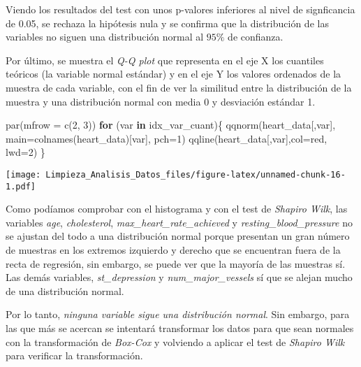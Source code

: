 \documentclass[
]{article}
\newenvironment{Shaded}{\begin{snugshade}}{\end{snugshade}}
\newcommand{\AttributeTok}[1]{\textcolor[rgb]{0.77,0.63,0.00}{#1}}
\newcommand{\CommentTok}[1]{\textcolor[rgb]{0.56,0.35,0.01}{\textit{#1}}}
\newcommand{\ControlFlowTok}[1]{\textcolor[rgb]{0.13,0.29,0.53}{\textbf{#1}}}
\newcommand{\DecValTok}[1]{\textcolor[rgb]{0.00,0.00,0.81}{#1}}
\newcommand{\FunctionTok}[1]{\textcolor[rgb]{0.00,0.00,0.00}{#1}}
\newcommand{\NormalTok}[1]{#1}
\newcommand{\OtherTok}[1]{\textcolor[rgb]{0.56,0.35,0.01}{#1}}
\newcommand{\SpecialCharTok}[1]{\textcolor[rgb]{0.00,0.00,0.00}{#1}}
\newcommand{\StringTok}[1]{\textcolor[rgb]{0.31,0.60,0.02}{#1}}
\begin{document}
Viendo los resultados del test con unos p-valores inferiores al nivel de
signficancia de 0.05, se rechaza la hipótesis nula y se confirma que la
distribución de las variables no siguen una distribución normal al
\(95 \%\) de confianza.

Por último, se muestra el \emph{Q-Q plot} que representa en el eje X los
cuantiles teóricos (la variable normal estándar) y en el eje Y los
valores ordenados de la muestra de cada variable, con el fin de ver la
similitud entre la distribución de la muestra y una distribución normal
con media 0 y desviación estándar 1.

\begin{Shaded}
\begin{Highlighting}[]
\FunctionTok{par}\NormalTok{(}\AttributeTok{mfrow =} \FunctionTok{c}\NormalTok{(}\DecValTok{2}\NormalTok{, }\DecValTok{3}\NormalTok{)) }
\ControlFlowTok{for}\NormalTok{ (var }\ControlFlowTok{in}\NormalTok{ idx\_var\_cuant)\{}
  \FunctionTok{qqnorm}\NormalTok{(heart\_data[,var], }\AttributeTok{main=}\FunctionTok{colnames}\NormalTok{(heart\_data)[var], }\AttributeTok{pch=}\DecValTok{1}\NormalTok{)}
  \FunctionTok{qqline}\NormalTok{(heart\_data[,var],}\AttributeTok{col=}\StringTok{\textquotesingle{}red\textquotesingle{}}\NormalTok{, }\AttributeTok{lwd=}\DecValTok{2}\NormalTok{) \}}
\end{Highlighting}
\end{Shaded}

\texttt{[image: Limpieza\_Analisis\_Datos\_files/figure-latex/unnamed-chunk-16-1.pdf]}

Como podíamos comprobar con el histograma y con el test de \emph{Shapiro
Wilk}, las variables \emph{age}, \emph{cholesterol},
\emph{max\_heart\_rate\_achieved} y \emph{resting\_blood\_pressure} no
se ajustan del todo a una distribución normal porque presentan un gran
número de muestras en los extremos izquierdo y derecho que se encuentran
fuera de la recta de regresión, sin embargo, se puede ver que la mayoría
de las muestras sí. Las demás variables, \emph{st\_depression} y
\emph{num\_major\_vessels} sí que se alejan mucho de una distribución
normal.

Por lo tanto, \emph{ninguna variable sigue una distribución normal}. Sin
embargo, para las que más se acercan se intentará transformar los datos
para que sean normales con la transformación de \emph{Box-Cox} y
volviendo a aplicar el test de \emph{Shapiro Wilk} para verificar la
transformación.

\begin{Shaded}
\end{Shaded}
\end{document}
